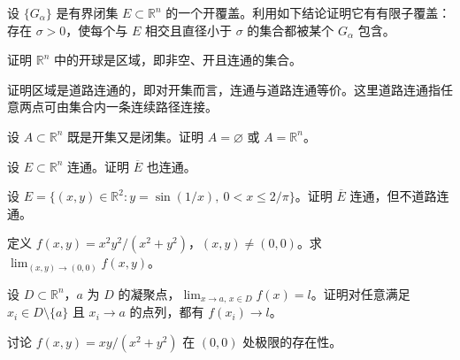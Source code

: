 \noindent\begin{minipage}{\textwidth}
设 $\{G_\alpha\}$ 是有界闭集 $E\subset\mathbb R^n$ 的一个开覆盖。利用如下结论证明它有有限子覆盖：存在 $\sigma>0$，使每个与 $E$ 相交且直径小于 $\sigma$ 的集合都被某个 $G_\alpha$ 包含。
\end{minipage}\par\vfill
\noindent\begin{minipage}{\textwidth}
证明 $\mathbb R^n$ 中的开球是区域，即非空、开且连通的集合。
\end{minipage}\par\vfill
\newpage
\noindent\begin{minipage}{\textwidth}
证明区域是道路连通的，即对开集而言，连通与道路连通等价。这里道路连通指任意两点可由集合内一条连续路径连接。
\end{minipage}\par\vfill
\noindent\begin{minipage}{\textwidth}
设 $A\subset\mathbb R^n$ 既是开集又是闭集。证明 $A=\varnothing$ 或 $A=\mathbb R^n$。
\end{minipage}\par\vfill
\noindent\begin{minipage}{\textwidth}
设 $E\subset\mathbb R^n$ 连通。证明 $\overline E$ 也连通。
\end{minipage}\par\vfill
\newpage
\noindent\begin{minipage}{\textwidth}
设 $E=\{(x,y)\in\mathbb R^2:y=\sin(1/x),\ 0<x\le2/\pi\}$。证明 $\overline E$ 连通，但不道路连通。
\end{minipage}\par\vfill
\noindent\begin{minipage}{\textwidth}
定义 $f(x,y)=x^2y^2/(x^2+y^2)$，$(x,y)\ne(0,0)$。求 $\lim_{(x,y)\to(0,0)}f(x,y)$。
\end{minipage}\par\vfill
\noindent\begin{minipage}{\textwidth}
设 $D\subset\mathbb R^n$，$a$ 为 $D$ 的凝聚点，$\lim_{x\to a,\,x\in D}f(x)=l$。证明对任意满足 $x_i\in D\setminus\{a\}$ 且 $x_i\to a$ 的点列，都有 $f(x_i)\to l$。
\end{minipage}\par\vfill
\newpage
\noindent\begin{minipage}{\textwidth}
讨论 $f(x,y)=xy/(x^2+y^2)$ 在 $(0,0)$ 处极限的存在性。
\end{minipage}\par\vfill
